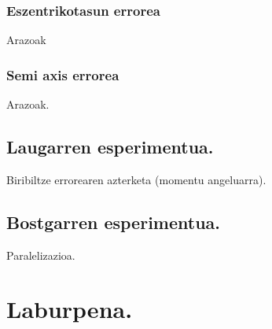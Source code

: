 \subsubsection*{Eszentrikotasun errorea}

Arazoak

\subsubsection*{Semi axis errorea}

Arazoak.


\subsection*{Laugarren esperimentua.}


Biribiltze errorearen azterketa (momentu angeluarra).


\subsection*{Bostgarren esperimentua.}

Paralelizazioa.


\section{Laburpena.}